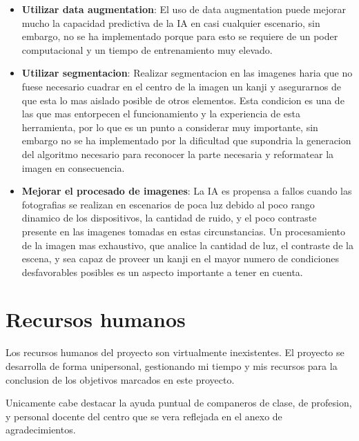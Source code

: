\documentclass{article}
\begin{document}
\begin{itemize}
    \item \textbf{Utilizar data augmentation}: El uso de data augmentation puede mejorar mucho la capacidad predictiva de la IA en casi cualquier escenario, sin embargo, no se ha implementado porque para esto se requiere de un poder computacional y un tiempo de entrenamiento muy elevado.
    \item \textbf{Utilizar segmentacion}: Realizar segmentacion en las imagenes haria que no fuese necesario cuadrar en el centro de la imagen un kanji y asegurarnos de que esta lo mas aislado posible de otros elementos. Esta condicion es una de las que mas entorpecen el funcionamiento y la experiencia de esta herramienta, por lo que es un punto a considerar muy importante, sin embargo no se ha implementado por la dificultad que supondria la generacion del algoritmo necesario para reconocer la parte necesaria y reformatear la imagen en consecuencia.
    \item \textbf{Mejorar el procesado de imagenes}: La IA es propensa a fallos cuando las fotografias se realizan en escenarios de poca luz debido al poco rango dinamico de los dispositivos, la cantidad de ruido, y el poco contraste presente en las imagenes tomadas en estas circunstancias. Un procesamiento de la imagen mas exhaustivo, que analice la cantidad de luz, el contraste de la escena, y sea capaz de proveer un kanji en el mayor numero de condiciones desfavorables posibles es un aspecto importante a tener en cuenta. 
\end{itemize}


\newpage

\section{Recursos humanos}

Los recursos humanos del proyecto son virtualmente inexistentes. El proyecto se desarrolla de forma unipersonal, gestionando mi tiempo y mis recursos para la conclusion de los objetivos marcados en este proyecto. 

Unicamente cabe destacar la ayuda puntual de companeros de clase, de profesion, y personal docente del centro que se vera reflejada en el anexo de agradecimientos.



\end{document}
